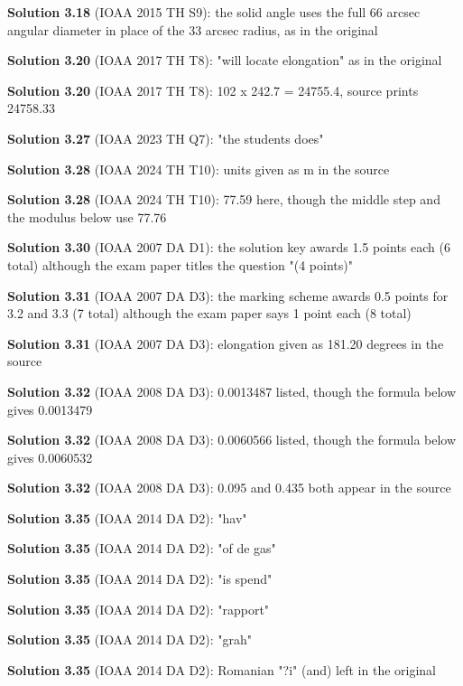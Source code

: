 \noindent\textbf{Solution 3.18} (IOAA 2015 TH S9): the solid angle uses the full 66 arcsec angular diameter in place of the 33 arcsec radius, as in the original
\smallskip

\noindent\textbf{Solution 3.20} (IOAA 2017 TH T8): "will locate elongation" as in the original
\smallskip

\noindent\textbf{Solution 3.20} (IOAA 2017 TH T8): 102 x 242.7 = 24755.4, source prints 24758.33
\smallskip

\noindent\textbf{Solution 3.27} (IOAA 2023 TH Q7): "the students does"
\smallskip

\noindent\textbf{Solution 3.28} (IOAA 2024 TH T10): units given as m in the source
\smallskip

\noindent\textbf{Solution 3.28} (IOAA 2024 TH T10): 77.59 here, though the middle step and the modulus below use 77.76
\smallskip

\noindent\textbf{Solution 3.30} (IOAA 2007 DA D1): the solution key awards 1.5 points each (6 total) although the exam paper titles the question "(4 points)"
\smallskip

\noindent\textbf{Solution 3.31} (IOAA 2007 DA D3): the marking scheme awards 0.5 points for 3.2 and 3.3 (7 total) although the exam paper says 1 point each (8 total)
\smallskip

\noindent\textbf{Solution 3.31} (IOAA 2007 DA D3): elongation given as 181.20 degrees in the source
\smallskip

\noindent\textbf{Solution 3.32} (IOAA 2008 DA D3): 0.0013487 listed, though the formula below gives 0.0013479
\smallskip

\noindent\textbf{Solution 3.32} (IOAA 2008 DA D3): 0.0060566 listed, though the formula below gives 0.0060532
\smallskip

\noindent\textbf{Solution 3.32} (IOAA 2008 DA D3): 0.095 and 0.435 both appear in the source
\smallskip

\noindent\textbf{Solution 3.35} (IOAA 2014 DA D2): "hav"
\smallskip

\noindent\textbf{Solution 3.35} (IOAA 2014 DA D2): "of de gas"
\smallskip

\noindent\textbf{Solution 3.35} (IOAA 2014 DA D2): "is spend"
\smallskip

\noindent\textbf{Solution 3.35} (IOAA 2014 DA D2): "rapport"
\smallskip

\noindent\textbf{Solution 3.35} (IOAA 2014 DA D2): "grah"
\smallskip

\noindent\textbf{Solution 3.35} (IOAA 2014 DA D2): Romanian "?i" (and) left in the original
\smallskip

